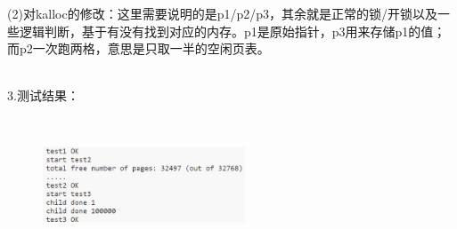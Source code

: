 \documentclass[12pt]{article}
\begin{document}
\noindent (2)对kalloc的修改：这里需要说明的是p1/p2/p3，其余就是正常的锁/开锁以及一些逻辑判断，基于有没有找到对应的内存。p1是原始指针，p3用来存储p1的值；而p2一次跑两格，意思是只取一半的空闲页表。
\begin{figure}[!h]
    \centering
    \hfill
\end{figure}\\
\newpage
\noindent 3.测试结果：
\begin{figure}[htbp]
    \begin{center}
        \includegraphics*[width=6cm,height=4cm]{lab1-6.jpg}
    \end{center}
\end{figure}\\
\end{document}
